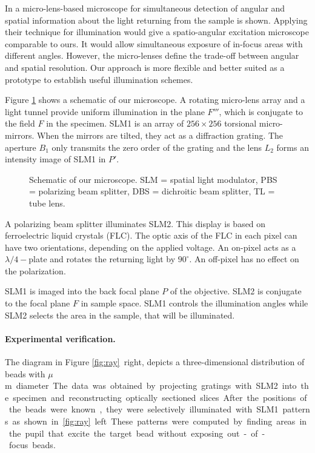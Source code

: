\documentclass[a4paper, 11pt]{article}
\begin{document}
\begin{multicols}{2}
In \cite{Levoy2009} a micro-lens-based microscope for simultaneous
detection of angular and spatial information about the light returning
from the sample is shown. Applying their technique for illumination
would give a spatio-angular excitation microscope comparable to
ours. It would allow simultaneous exposure of in-focus areas with
different angles. However, the micro-lenses define the trade-off
between angular and spatial resolution. Our approach is more flexible
and better suited as a prototype to establish useful illumination
schemes.

 Figure \ref{fig:system}
shows a schematic of our microscope. A rotating micro-lens array and a
light tunnel provide uniform illumination in the plane $F'''$, which
is conjugate to the field $F$ in the specimen. SLM1 is an array of
$256\times 256$ torsional micro-mirrors. When the mirrors are tilted,
they act as a diffraction grating. The aperture $B_1$ only transmits
the zero order of the grating and the lens $L_2$ forms an intensity
image of SLM1 in $P'$.


\begin{figure}[H]
\centeringx
{\scriptsize }
\caption{Schematic of our microscope. SLM = spatial light modulator,
  PBS = polarizing beam splitter, DBS = dichroitic beam splitter, TL =
  tube lens. %
}
\label{fig:system}
\end{figure}

A polarizing beam splitter illuminates SLM2. This display is based on
ferroelectric liquid crystals (FLC). The optic axis of the FLC in each
pixel can have two orientations, depending on the applied voltage. An
on-pixel acts as a $\lambda/4-$plate and rotates the returning light
by $90^\circ$. An off-pixel has no effect on the polarization.


 SLM1 is imaged into the back focal plane $P$ of the
objective. SLM2 is conjugate to the focal plane $F$ in sample space.
SLM1 controls the illumination angles while SLM2 selects the area in
the sample, that will be illuminated.


\paragraph{Experimental verification.}
The diagram in Figure \ref{fig:ray}~right, depicts a three-dimensional
distribution of beads with \unit[2]{$\mu$m} diameter. The data was
obtained by projecting gratings with SLM2 into the specimen and
reconstructing optically sectioned slices. After the positions of the
beads were known, they were selectively illuminated with SLM1 patterns
as shown in \ref{fig:ray}~left. These patterns were computed by
finding areas in the pupil that excite the target bead without
exposing out-of-focus beads.


\end{multicols}
\end{document}
